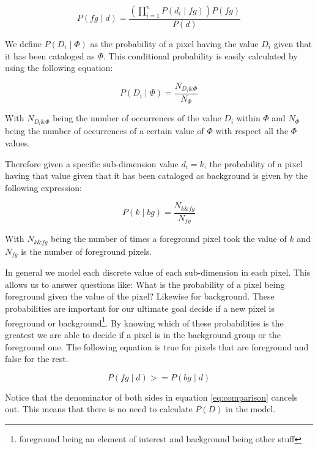 \documentclass[a4paper,12pt]{report}
\begin{document}
\begin{equation}
P(fg \mid d) = \frac{(\prod_{i=1}^n{P(d_i \mid fg)}) P(fg)}{P(d)}
\end{equation}

We define $P(D_i \mid \Phi)$ as the probability of a pixel having the value $D_i$
given that it has been cataloged as $\Phi$. This conditional probability is
easily calculated by using the following equation:

\begin{equation}\label{eq:dimgivenphi}
P(D_i \mid \Phi) = \frac{N_{D_i\&\Phi}}{N_{\Phi}}
\end{equation}

With $N_{D_i\&\Phi}$ being the number of occurrences of the value $D_i$ within
$\Phi$ and $N_{\Phi}$ being the number of occurrences of a certain value of
$\Phi$ with respect all the $\Phi$ values.

Therefore given a specific sub-dimension value $d_i=k$, the probability of a
pixel having that value given that it has been cataloged as background is given
by the following expression:

\begin{equation}
P(k \mid bg) = \frac{N_{k\&fg}}{N_{fg}}
\end{equation}

With $N_{k\&fg}$ being the number of times a foreground pixel took the value of
$k$ and $N_{fg}$ is the number of foreground pixels.

In general we model each discrete value of each sub-dimension in
each pixel. This allows us to answer questions like: What is the probability of
a pixel being foreground given the value of the pixel? Likewise for background.
These probabilities are important for our ultimate goal decide if a new pixel
is foreground or background\footnote{foreground being an element of interest
and background being other stuff}. By knowing which of these probabilities is
the greatest we are able to decide if a pixel is in the background group or the
foreground one. The following equation is true for pixels that are foreground
and false for the rest.

\begin{equation}\label{eq:comparison}
P(fg \mid d) >= P(bg \mid d)
\end{equation}

Notice that the denominator of both sides in equation \ref{eq:comparison}
cancels out. This means that there is no need to calculate $P(D)$ in the model.
\end{document}
